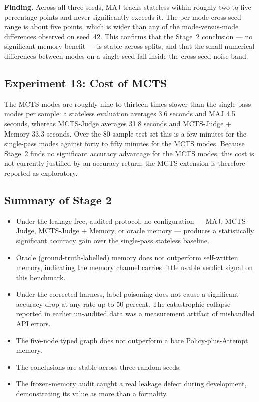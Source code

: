 \documentclass[12pt,a4paper]{report}
\begin{document}
\textbf{Finding.} Across all three seeds, MAJ tracks stateless within roughly two to five percentage points and never significantly exceeds it. The per-mode cross-seed range is about five points, which is wider than any of the mode-versus-mode differences observed on seed~42. This confirms that the Stage~2 conclusion --- no significant memory benefit --- is stable across splits, and that the small numerical differences between modes on a single seed fall inside the cross-seed noise band.

\subsection{Experiment 13: Cost of MCTS}

The MCTS modes are roughly nine to thirteen times slower than the single-pass modes per sample: a stateless evaluation averages 3.6 seconds and MAJ 4.5 seconds, whereas MCTS-Judge averages 31.8 seconds and MCTS-Judge + Memory 33.3 seconds. Over the 80-sample test set this is a few minutes for the single-pass modes against forty to fifty minutes for the MCTS modes. Because Stage~2 finds no significant accuracy advantage for the MCTS modes, this cost is not currently justified by an accuracy return; the MCTS extension is therefore reported as exploratory.

\subsection{Summary of Stage 2}

\begin{itemize}
    \item Under the leakage-free, audited protocol, no configuration --- MAJ, MCTS-Judge, MCTS-Judge + Memory, or oracle memory --- produces a statistically significant accuracy gain over the single-pass stateless baseline.
    \item Oracle (ground-truth-labelled) memory does not outperform self-written memory, indicating the memory channel carries little usable verdict signal on this benchmark.
    \item Under the corrected harness, label poisoning does not cause a significant accuracy drop at any rate up to 50 percent. The catastrophic collapse reported in earlier un-audited data was a measurement artifact of mishandled API errors.
    \item The five-node typed graph does not outperform a bare Policy-plus-Attempt memory.
    \item The conclusions are stable across three random seeds.
    \item The frozen-memory audit caught a real leakage defect during development, demonstrating its value as more than a formality.
\end{itemize}
\end{document}
